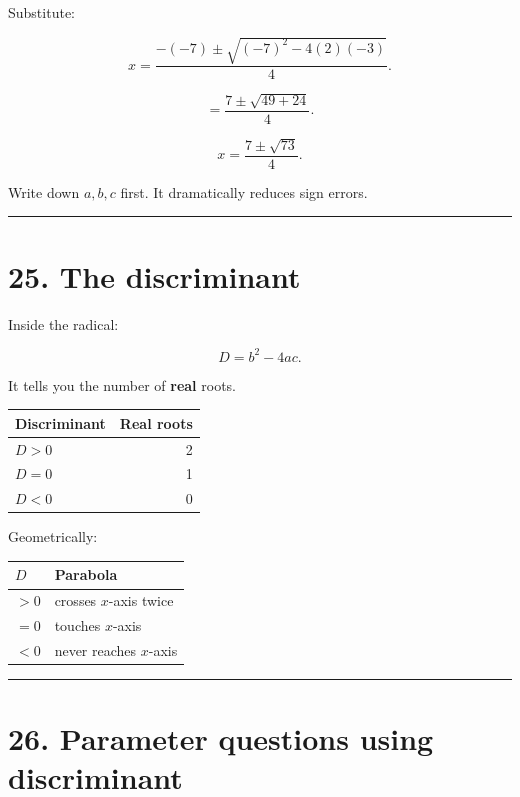 \documentclass[
]{article}
\newcounter{none} %
\begin{document}
Substitute:

\[
x=
\frac{-(-7)\pm\sqrt{(-7)^2-4(2)(-3)}}{4}.
\]

\[
=
\frac{7\pm\sqrt{49+24}}4.
\]

\[
\boxed{x=\frac{7\pm\sqrt{73}}4}.
\]

Write down \(a,b,c\) first. It dramatically reduces sign errors.

\begin{center}\rule{0.5\linewidth}{0.5pt}\end{center}

\section{25. The discriminant}\label{the-discriminant}

Inside the radical:

\[
\boxed{D=b^2-4ac}.
\]

It tells you the number of \textbf{real} roots.

{\def\LTcaptype{none} %
\begin{longtable}[]{@{}lr@{}}
\toprule\noalign{}
Discriminant & Real roots \\
\midrule\noalign{}
\endhead
\bottomrule\noalign{}
\endlastfoot
\(D>0\) & 2 \\
\(D=0\) & 1 \\
\(D<0\) & 0 \\
\end{longtable}
}

Geometrically:

{\def\LTcaptype{none} %
\begin{longtable}[]{@{}ll@{}}
\toprule\noalign{}
\(D\) & Parabola \\
\midrule\noalign{}
\endhead
\bottomrule\noalign{}
\endlastfoot
\(>0\) & crosses \(x\)-axis twice \\
\(=0\) & touches \(x\)-axis \\
\(<0\) & never reaches \(x\)-axis \\
\end{longtable}
}

\begin{center}\rule{0.5\linewidth}{0.5pt}\end{center}

\section{26. Parameter questions using
discriminant}\label{parameter-questions-using-discriminant}
\end{document}
